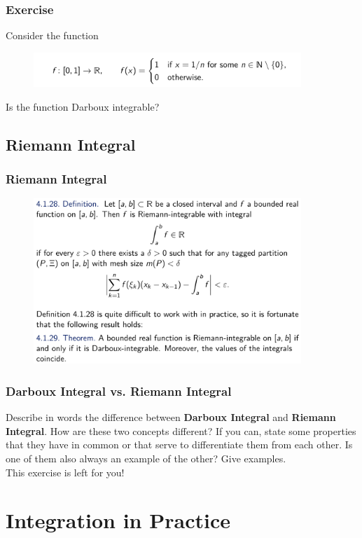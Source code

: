 \documentclass[10pt, t]{beamer}
\newcommand{\nullspace}{~\\[15pt]}
\begin{document}
\begin{frame}
    \frametitle{Exercise}
    Consider the function
    \begin{figure}[H]
        \centering
        \includegraphics[width=0.9\textwidth]{2020-12-02-12-24-56.png}
    \end{figure}
    Is the function Darboux integrable?
\end{frame}

\subsection{Riemann Integral}
\begin{frame}
    \frametitle{Riemann Integral}
    \begin{figure}[H]
        \centering
        \includegraphics[width=0.9\textwidth]{2020-12-02-12-12-35.png}
    \end{figure}
\end{frame}

\begin{frame}
    \frametitle{Darboux Integral vs. Riemann Integral}
    Describe in words the difference between \textbf{Darboux Integral} and \textbf{Riemann Integral}. How are these two concepts different? If you can, state some properties that they have in common or that serve to differentiate them from each other. Is one of them also always an example of the other? Give examples.
    \nullspace
    This exercise is left for you!
\end{frame}

\section{Integration in Practice}
\end{document}
